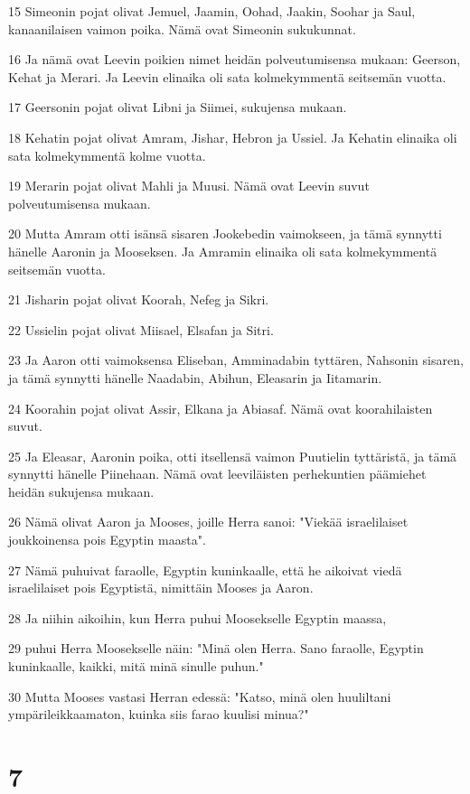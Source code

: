 \par 15 Simeonin pojat olivat Jemuel, Jaamin, Oohad, Jaakin, Soohar ja Saul, kanaanilaisen vaimon poika. Nämä ovat Simeonin sukukunnat.
\par 16 Ja nämä ovat Leevin poikien nimet heidän polveutumisensa mukaan: Geerson, Kehat ja Merari. Ja Leevin elinaika oli sata kolmekymmentä seitsemän vuotta.
\par 17 Geersonin pojat olivat Libni ja Siimei, sukujensa mukaan.
\par 18 Kehatin pojat olivat Amram, Jishar, Hebron ja Ussiel. Ja Kehatin elinaika oli sata kolmekymmentä kolme vuotta.
\par 19 Merarin pojat olivat Mahli ja Muusi. Nämä ovat Leevin suvut polveutumisensa mukaan.
\par 20 Mutta Amram otti isänsä sisaren Jookebedin vaimokseen, ja tämä synnytti hänelle Aaronin ja Mooseksen. Ja Amramin elinaika oli sata kolmekymmentä seitsemän vuotta.
\par 21 Jisharin pojat olivat Koorah, Nefeg ja Sikri.
\par 22 Ussielin pojat olivat Miisael, Elsafan ja Sitri.
\par 23 Ja Aaron otti vaimoksensa Eliseban, Amminadabin tyttären, Nahsonin sisaren, ja tämä synnytti hänelle Naadabin, Abihun, Eleasarin ja Iitamarin.
\par 24 Koorahin pojat olivat Assir, Elkana ja Abiasaf. Nämä ovat koorahilaisten suvut.
\par 25 Ja Eleasar, Aaronin poika, otti itsellensä vaimon Puutielin tyttäristä, ja tämä synnytti hänelle Piinehaan. Nämä ovat leeviläisten perhekuntien päämiehet heidän sukujensa mukaan.
\par 26 Nämä olivat Aaron ja Mooses, joille Herra sanoi: "Viekää israelilaiset joukkoinensa pois Egyptin maasta".
\par 27 Nämä puhuivat faraolle, Egyptin kuninkaalle, että he aikoivat viedä israelilaiset pois Egyptistä, nimittäin Mooses ja Aaron.
\par 28 Ja niihin aikoihin, kun Herra puhui Moosekselle Egyptin maassa,
\par 29 puhui Herra Moosekselle näin: "Minä olen Herra. Sano faraolle, Egyptin kuninkaalle, kaikki, mitä minä sinulle puhun."
\par 30 Mutta Mooses vastasi Herran edessä: "Katso, minä olen huuliltani ympärileikkaamaton, kuinka siis farao kuulisi minua?"

\chapter{7}

